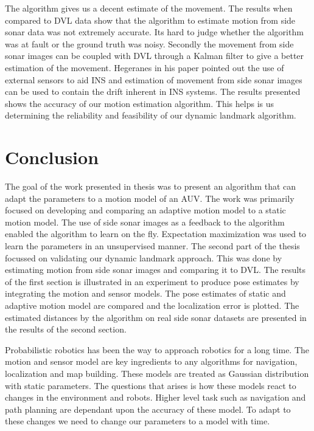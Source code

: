 \documentclass[12pt]{dalcsthesis}
\begin{document}
The algorithm gives us a decent estimate of the movement. The results when compared to DVL data show that the algorithm to estimate motion from side sonar data was not extremely accurate. Its hard to judge whether the algorithm was at fault or the ground truth was noisy. Secondly the movement from side sonar images can be coupled with DVL through a Kalman filter to give a better estimation of the movement. Hegeranes \cite{Hegrenæs2008}in his paper pointed out the use of external sensors to aid INS and estimation of movement from side sonar images can be used to contain the drift inherent in INS systems. 
The results presented shows the accuracy of our motion estimation algorithm. This helps is us determining the reliability and feasibility of our dynamic landmark algorithm.   
\chapter{Conclusion}
The goal of the work presented in thesis was to present an algorithm that can adapt the parameters to a motion model of an AUV. The work was primarily focused on developing and comparing an adaptive motion model to a static motion model. The use of side sonar images as a feedback to the algorithm enabled the algorithm to learn on the fly. Expectation maximization was used to learn the parameters in an unsupervised manner. The second part of the thesis focussed on validating our dynamic landmark approach. This was done by estimating motion from side sonar images and comparing it to DVL. The results of the first section is illustrated in an experiment to produce pose estimates by integrating the motion and sensor models. The pose estimates of static and adaptive motion model are compared and the localization error is plotted. The estimated distances by the algorithm on real side sonar datasets are presented in the results of the second section.

Probabilistic robotics has been the way to approach robotics for a long time. The motion and sensor model are key ingredients to any algorithms for navigation, localization and map building. These models are treated as Gaussian distribution with static parameters. The questions that arises is how these models react to changes in the environment and robots. Higher level task such as navigation and path planning are dependant upon the accuracy of these model. To adapt to these changes we need to change our parameters to a model with time.
\end{document}
